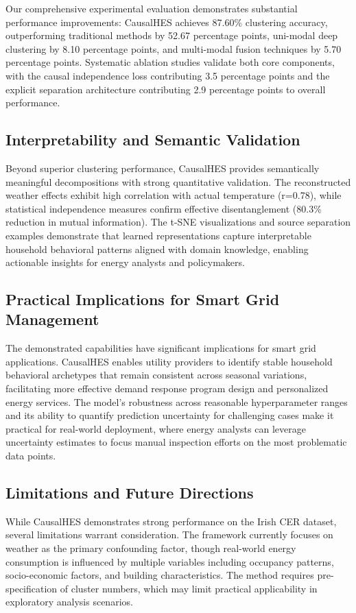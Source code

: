 \documentclass[journal]{IEEEtran}
\begin{document}
Our comprehensive experimental evaluation demonstrates substantial performance improvements: CausalHES achieves 87.60\% clustering accuracy, outperforming traditional methods by 52.67 percentage points, uni-modal deep clustering by 8.10 percentage points, and multi-modal fusion techniques by 5.70 percentage points. Systematic ablation studies validate both core components, with the causal independence loss contributing 3.5 percentage points and the explicit separation architecture contributing 2.9 percentage points to overall performance.

\subsection{Interpretability and Semantic Validation}
Beyond superior clustering performance, CausalHES provides semantically meaningful decompositions with strong quantitative validation. The reconstructed weather effects exhibit high correlation with actual temperature (r=0.78), while statistical independence measures confirm effective disentanglement (80.3\% reduction in mutual information). The t-SNE visualizations and source separation examples demonstrate that learned representations capture interpretable household behavioral patterns aligned with domain knowledge, enabling actionable insights for energy analysts and policymakers.

\subsection{Practical Implications for Smart Grid Management}
The demonstrated capabilities have significant implications for smart grid applications. CausalHES enables utility providers to identify stable household behavioral archetypes that remain consistent across seasonal variations, facilitating more effective demand response program design and personalized energy services. The model's robustness across reasonable hyperparameter ranges and its ability to quantify prediction uncertainty for challenging cases make it practical for real-world deployment, where energy analysts can leverage uncertainty estimates to focus manual inspection efforts on the most problematic data points.

\subsection{Limitations and Future Directions}
While CausalHES demonstrates strong performance on the Irish CER dataset, several limitations warrant consideration. The framework currently focuses on weather as the primary confounding factor, though real-world energy consumption is influenced by multiple variables including occupancy patterns, socio-economic factors, and building characteristics. The method requires pre-specification of cluster numbers, which may limit practical applicability in exploratory analysis scenarios.
\end{document}

